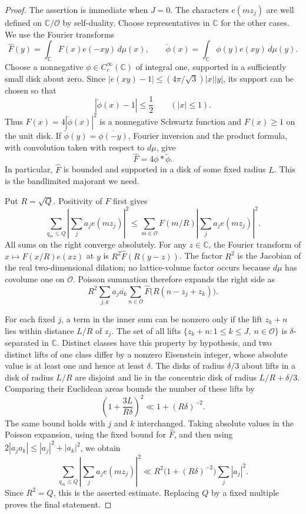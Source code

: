 \begin{proof}
The assertion is immediate when $J=0$.  The characters $e(mz_j)$ are
well defined on $\mathbb C/\mathcal O$ by self-duality.  Choose
representatives in $\mathbb C$ for the other cases.  We use the Fourier transforms
\[
 \widehat F(y)=\int_{\mathbb C}F(x)e(-xy)\,d\mu(x),\qquad
 \check\phi(x)=\int_{\mathbb C}\phi(y)e(xy)\,d\mu(y).
\]
Choose a nonnegative $\phi\in C_c^\infty(\mathbb C)$ of integral one,
supported in a sufficiently small disk about zero.  Since
$|e(xy)-1|\le (4\pi/\sqrt3)|x||y|$, its support can be chosen so that
\[
 |\check\phi(x)-1|\le\frac12\qquad(|x|\le1).
\]
Thus $F(x)=4|\check\phi(x)|^2$ is a nonnegative Schwartz function and
$F(x)\ge1$ on the unit disk.  If
$\widetilde\phi(y)=\overline{\phi(-y)}$, Fourier inversion and the product
formula, with convolution taken with respect to $d\mu$, give
\[
 \widehat F=4\phi*\widetilde\phi.
\]
In particular, $\widehat F$ is bounded and supported in a disk of some fixed
radius $L$.  This is the bandlimited majorant we need.

Put $R=\sqrt Q$.  Positivity of $F$ first gives
\[
 \sum_{q_m\le Q}\left|\sum_j a_je(mz_j)\right|^2
 \le \sum_{m\in\mathcal O}F(m/R)
                    \left|\sum_j a_je(mz_j)\right|^2.
\]
All sums on the right converge absolutely.  For any $z\in\mathbb C$,
the Fourier transform of $x\mapsto F(x/R)e(xz)$ at $y$ is
$R^2\widehat F(R(y-z))$.  The factor $R^2$ is the Jacobian of the real
two-dimensional dilation; no lattice-volume factor occurs because $d\mu$
has covolume one on $\mathcal O$.  Poisson summation therefore expands the
right side as
\[
 R^2\sum_{j,k}a_j\overline{a_k}
       \sum_{n\in\mathcal O}
       \widehat F\bigl(R(n-z_j+z_k)\bigr).
\]

For each fixed $j$, a term in the inner sum can be nonzero only if the lift
$z_k+n$ lies within distance $L/R$ of $z_j$.  The set of all lifts
$\{z_k+n:1\le k\le J,\ n\in\mathcal O\}$ is $\delta$-separated in
$\mathbb C$.  Distinct classes have this property by hypothesis, and two
distinct lifts of one class differ by a nonzero Eisenstein integer, whose
absolute value is at least one and hence at least $\delta$.
The disks of radius $\delta/3$ about lifts in a disk of radius $L/R$ are
disjoint and lie in the concentric disk of radius $L/R+\delta/3$.
Comparing their Euclidean areas bounds the number of these lifts by
\[
 \left(1+\frac{3L}{R\delta}\right)^2
 \ll 1+(R\delta)^{-2}.
\]
The same bound holds with $j$ and $k$ interchanged.  Taking absolute values
in the Poisson expansion, using the fixed bound for $\widehat F$, and then
using $2|a_ja_k|\le |a_j|^2+|a_k|^2$, we obtain
\[
 \sum_{q_m\le Q}\left|\sum_j a_je(mz_j)\right|^2
 \ll R^2\bigl(1+(R\delta)^{-2}\bigr)\sum_j|a_j|^2.
\]
Since $R^2=Q$, this is the asserted estimate.  Replacing $Q$ by a fixed
multiple proves the final statement.
\end{proof}


